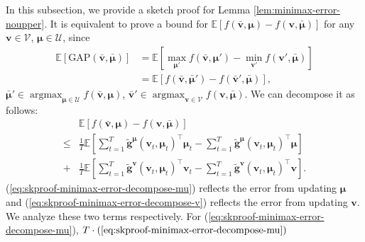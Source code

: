 \documentclass[12pt]{article}
\begin{document}
In this subsection, we provide a sketch proof for Lemma \ref{lem:minimax-error-noupper}. It is equivalent to prove a bound for 
$\mathbb{E}[f(\bar{\boldsymbol{v}},\boldsymbol{\mu}) - f(\boldsymbol{v},\bar{\boldsymbol{\mu}})]$ for any $\boldsymbol{v} \in \mathcal{V}$, $\boldsymbol{\mu} \in \mathcal{U}$, since 
\begin{equation*}
\begin{aligned}
\mathbb{E}[\text{GAP}(\bar{\boldsymbol{v}},\bar{\boldsymbol{\mu}})] &= \mathbb{E}[\max_{\boldsymbol{\mu}'} f(\bar{\boldsymbol{v}},\boldsymbol{\mu}') - \min_{\boldsymbol{v}'} f(\boldsymbol{v}',\bar{\boldsymbol{\mu}})] \\
&= \mathbb{E}[f(\bar{\boldsymbol{v}},\bar{\boldsymbol{\mu}}') - f(\bar{\boldsymbol{v}}',\bar{\boldsymbol{\mu}})],
\end{aligned}
\end{equation*}
$\bar{\boldsymbol{\mu}}' \in \mathop{\arg\max}_{\boldsymbol{\mu} \in \mathcal{U}} f(\bar{\boldsymbol{v}},\boldsymbol{\mu})$,  $\bar{\boldsymbol{v}}' \in \mathop{\arg\max}_{\boldsymbol{v} \in \mathcal{V}} f(\boldsymbol{v},\bar{\boldsymbol{\mu}})$. We can decompose it as follows:
\begin{subequations}
    \begin{align}
        & \mathbb{E} \left[ f(\bar{\boldsymbol{v}},\boldsymbol{\mu}) - f(\boldsymbol{v},\bar{\boldsymbol{\mu}})\right] \nonumber \\
        \le & \frac{1}{T} \mathbb{E}\left [ \sum_{t=1}^T \tilde{\boldsymbol{g}}^{\boldsymbol{\mu}}(\boldsymbol{v}_t,\boldsymbol{\mu}_t)^{\top} \boldsymbol{\mu}_t - \sum_{t=1}^T \tilde{\boldsymbol{g}}^{\boldsymbol{\mu}}(\boldsymbol{v}_t,\boldsymbol{\mu}_t)^{\top} \boldsymbol{\mu} \right] \label{eq:skproof-minimax-error-decompose-mu} \\
        + & \frac{1}{T}\mathbb{E}\left [ \sum_{t=1}^T \tilde{\boldsymbol{g}}^{\boldsymbol{v}}(\boldsymbol{v}_t,\boldsymbol{\mu}_t)^{\top} \boldsymbol{v}_t - \sum_{t=1}^T \tilde{\boldsymbol{g}}^{\boldsymbol{v}}(\boldsymbol{v}_t,\boldsymbol{\mu}_t)^{\top} \boldsymbol{v}\right]. \label{eq:skproof-minimax-error-decompose-v}
        \end{align}
    \label{eq:skproof-minimax-error-decompose}
\end{subequations}
(\ref{eq:skproof-minimax-error-decompose-mu}) reflects the error from updating $\boldsymbol{\mu}$ and (\ref{eq:skproof-minimax-error-decompose-v}) reflects the error from updating $\boldsymbol{v}$. We analyze these two terms respectively. For (\ref{eq:skproof-minimax-error-decompose-mu}), $T \cdot (\ref{eq:skproof-minimax-error-decompose-mu})$
\end{document}
